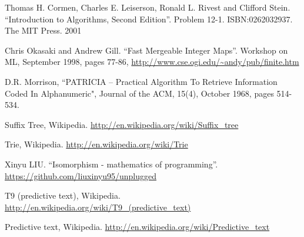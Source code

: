 \documentclass[b5paper]{article}
\begin{document}
\ifx\wholebook\relax \else
\begin{thebibliography}{99}

Thomas H. Cormen, Charles E. Leiserson, Ronald L. Rivest and Clifford Stein.
``Introduction to Algorithms, Second Edition''. Problem 12-1. ISBN:0262032937. The MIT Press. 2001

Chris Okasaki and Andrew Gill. ``Fast Mergeable Integer
Maps''. Workshop on ML, September 1998, pages 77-86, \url{http://www.cse.ogi.edu/~andy/pub/finite.htm}

D.R. Morrison, ``PATRICIA -- Practical Algorithm To Retrieve  Information Coded In Alphanumeric", Journal of the ACM, 15(4), October 1968, pages 514-534.

Suffix Tree, Wikipedia. \url{http://en.wikipedia.org/wiki/Suffix_tree}

Trie, Wikipedia. \url{http://en.wikipedia.org/wiki/Trie}

Xinyu LIU. ``Isomorphism - mathematics of programming''. \url{https://github.com/liuxinyu95/unplugged}

T9 (predictive text), Wikipedia. \url{http://en.wikipedia.org/wiki/T9_(predictive_text)}

Predictive text,
Wikipedia. \url{http://en.wikipedia.org/wiki/Predictive_text}

\end{thebibliography}

\expandafter\enddocument
\fi
\end{document}
